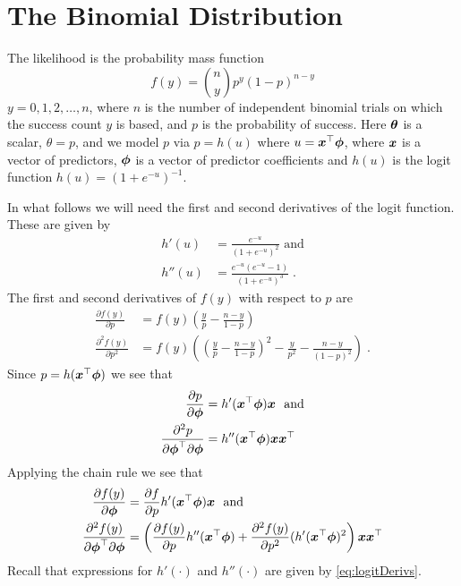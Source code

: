 \section{The Binomial Distribution}

The likelihood is the probability mass function
\[
f(y) = \binom{n}{y} p^y (1-p)^{n-y}
\]
$y = 0, 1, 2, \ldots, n$, where $n$ is the number of independent
binomial trials on which the success count $y$ is based, and $p$ is
the probability of success.  Here $\mbox{$\boldsymbol{\theta}$}$ is a scalar, $\theta =
p$, and we model $p$ via $p = h(u)$ where $u = \mbox{$\boldsymbol{x}$}^{\top} \mbox{$\boldsymbol{\phi}$}$,
where $\mbox{$\boldsymbol{x}$}$ is a vector of predictors, $\mbox{$\boldsymbol{\phi}$}$ is a vector of
predictor coefficients and $h(u)$ is the logit function $h(u) =
(1 + e^{-u})^{-1}$.

In what follows we will need the first and second derivatives of
the logit function.  These are given by
\begin{equation}
\begin{split}
h'(u) &= \frac{e^{-u}}{(1+e^{-u})^2} \mbox{~and} \\
h''(u) &= \frac{e^{-u}(e^{-u} - 1)}{(1+e^{-u})^3} \; .
\end{split}
\label{eq:logitDerivs}
\end{equation}
The first and second derivatives of $f(y)$
with respect to $p$ are
\begin{align*}
\frac{\partial f(y)}{\partial p} &= f(y)
      \left ( \frac{y}{p} - \frac{n-y}{1-p} \right )\\
\frac{\partial^2 f(y)}{\partial p^2} &= f(y)
      \left ( \left (\frac{y}{p} - \frac{n-y}{1-p} \right)^2 -
              \frac{y}{p^2} - \frac{n-y}{(1-p)^2} \right ) \; .
\end{align*}
Since $p = h(\mbox{$\boldsymbol{x}$}^{\top} \mbox{$\boldsymbol{\phi}$})$ we see that
\begin{align*}
\frac{\partial p}{\partial \mbox{$\boldsymbol{\phi}$}} &= h'(\mbox{$\boldsymbol{x}$}^{\top} \mbox{$\boldsymbol{\phi}$}) \mbox{$\boldsymbol{x}$}
\mbox{~ and}\\
\frac{\partial^2 p}{\partial \mbox{$\boldsymbol{\phi}$}^{\top} \partial \mbox{$\boldsymbol{\phi}$}} &=
h''(\mbox{$\boldsymbol{x}$}^{\top} \mbox{$\boldsymbol{\phi}$}) \mbox{$\boldsymbol{x}$} \mbox{$\boldsymbol{x}$}^{\top}
\end{align*}
Applying the chain rule we see that
\begin{align*}
\frac{\partial f(y)}{\partial \mbox{$\boldsymbol{\phi}$}} &= \frac{\partial f}
                 {\partial p}  h'(\mbox{$\boldsymbol{x}$}^{\top} \mbox{$\boldsymbol{\phi}$}) \mbox{$\boldsymbol{x}$}
\mbox{~ and}\\
\frac{\partial^2 f(y)}{\partial \mbox{$\boldsymbol{\phi}$}^{\top} \partial \mbox{$\boldsymbol{\phi}$}} &= \left (
\frac{\partial f(y)}{\partial p} h''(\mbox{$\boldsymbol{x}$}^{\top} \mbox{$\boldsymbol{\phi}$}) +
\frac{\partial^2 f(y)}{\partial p^2} (h'(\mbox{$\boldsymbol{x}$}^{\top} \mbox{$\boldsymbol{\phi}$})^2
      \right) \mbox{$\boldsymbol{x}$} \mbox{$\boldsymbol{x}$}^{\top}
\end{align*}
Recall that expressions for $h'(\cdot)$ and $h''(\cdot)$ are
given by \eqref{eq:logitDerivs}.

